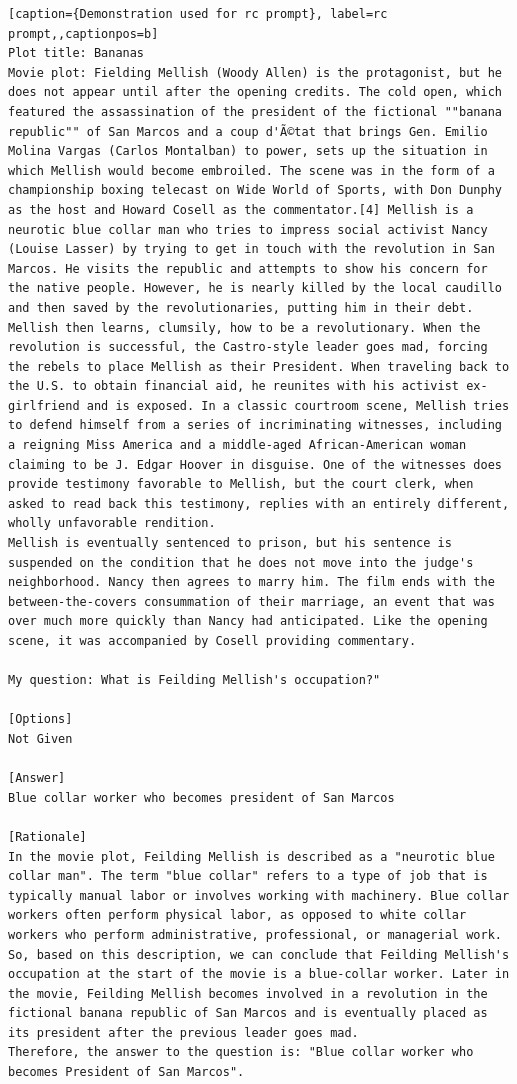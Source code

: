 \begin{lstlisting}[caption={Demonstration used for rc prompt}, label=rc prompt,,captionpos=b]
Plot title: Bananas
Movie plot: Fielding Mellish (Woody Allen) is the protagonist, but he does not appear until after the opening credits. The cold open, which featured the assassination of the president of the fictional ""banana republic"" of San Marcos and a coup d'Ã©tat that brings Gen. Emilio Molina Vargas (Carlos Montalban) to power, sets up the situation in which Mellish would become embroiled. The scene was in the form of a championship boxing telecast on Wide World of Sports, with Don Dunphy as the host and Howard Cosell as the commentator.[4] Mellish is a neurotic blue collar man who tries to impress social activist Nancy (Louise Lasser) by trying to get in touch with the revolution in San Marcos. He visits the republic and attempts to show his concern for the native people. However, he is nearly killed by the local caudillo and then saved by the revolutionaries, putting him in their debt. Mellish then learns, clumsily, how to be a revolutionary. When the revolution is successful, the Castro-style leader goes mad, forcing the rebels to place Mellish as their President. When traveling back to the U.S. to obtain financial aid, he reunites with his activist ex-girlfriend and is exposed. In a classic courtroom scene, Mellish tries to defend himself from a series of incriminating witnesses, including a reigning Miss America and a middle-aged African-American woman claiming to be J. Edgar Hoover in disguise. One of the witnesses does provide testimony favorable to Mellish, but the court clerk, when asked to read back this testimony, replies with an entirely different, wholly unfavorable rendition. 
Mellish is eventually sentenced to prison, but his sentence is suspended on the condition that he does not move into the judge's neighborhood. Nancy then agrees to marry him. The film ends with the between-the-covers consummation of their marriage, an event that was over much more quickly than Nancy had anticipated. Like the opening scene, it was accompanied by Cosell providing commentary.

My question: What is Feilding Mellish's occupation?"

[Options]
Not Given

[Answer]
Blue collar worker who becomes president of San Marcos

[Rationale]
In the movie plot, Feilding Mellish is described as a "neurotic blue collar man". The term "blue collar" refers to a type of job that is typically manual labor or involves working with machinery. Blue collar workers often perform physical labor, as opposed to white collar workers who perform administrative, professional, or managerial work. 
So, based on this description, we can conclude that Feilding Mellish's occupation at the start of the movie is a blue-collar worker. Later in the movie, Feilding Mellish becomes involved in a revolution in the fictional banana republic of San Marcos and is eventually placed as its president after the previous leader goes mad.
Therefore, the answer to the question is: "Blue collar worker who becomes President of San Marcos".




\end{lstlisting}
